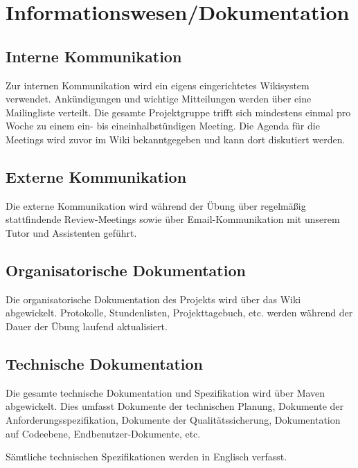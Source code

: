

\section{Informationswesen/Dokumentation}
\subsection{Interne Kommunikation}
Zur internen Kommunikation wird ein eigens eingerichtetes Wikisystem verwendet.
Ankündigungen und wichtige Mitteilungen werden über eine Mailingliste verteilt. 
Die gesamte Projektgruppe trifft sich mindestens einmal pro Woche zu einem ein- bis eineinhalbstündigen Meeting. 
Die Agenda für die Meetings wird zuvor im Wiki bekanntgegeben und kann dort diskutiert werden. 

\subsection{Externe Kommunikation}
Die externe Kommunikation wird während der Übung über regelmäßig stattfindende Review-Meetings sowie über Email-Kommunikation mit unserem Tutor und Assistenten geführt.

\subsection{Organisatorische Dokumentation}
Die organisatorische Dokumentation des Projekts wird über das Wiki abgewickelt. 
Protokolle, Stundenlisten, Projekttagebuch, etc. werden während der Dauer der Übung laufend aktualisiert.

\subsection{Technische Dokumentation}
Die gesamte technische Dokumentation und Spezifikation wird über Maven abgewickelt. 
Dies umfasst Dokumente der technischen Planung, Dokumente der Anforderungsspezifikation, 
Dokumente der Qualitätssicherung, Dokumentation auf Codeebene, Endbenutzer-Dokumente, etc.

Sämtliche technischen Spezifikationen werden in Englisch verfasst.
